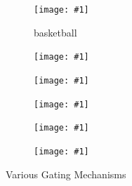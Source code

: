 

\newcommand{\addSubFigSixth}[2]{\begin{subfigure}[t]{.15\linewidth}
   \texttt{[image: \#1]}
   \label{#2}\end{subfigure}
}

\newcommand{\addSubFigSixthLabel}[3]{\begin{subfigure}[t]{.30\linewidth}
   \texttt{[image: \#1]}
   \caption{#2}\label{#3}\end{subfigure}
}

\begin{figure}%
    \centering
    \addSubFigSixthLabel{channel_gated/basketball_11_real_A}{basketball}{fig:basketball_input} 
    \addSubFigSixth{channel_gated/basketball_11_fake_B}{fig:basketball_ours} 
    \addSubFigSixth{block_gated/basketball_11_fake_B}{fig:basketball_block}
    \addSubFigSixth{channel_gated_affine/basketball_11_fake_B}{fig:basketball_channel_affine}
    \addSubFigSixth{block_gated_affine/basketball_11_fake_B}{fig:basketball_block_affine}
    \addSubFigSixth{adain/basketball_11_fake_B}{fig:basketball_adain}
    \caption{Various Gating Mechanisms}
    \label{fig:multi-task_cityscapes}
    \vspace{-3mm}
\end{figure}

